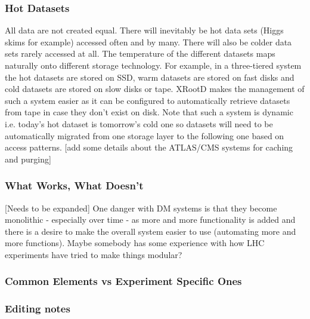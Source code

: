 \subsubsection{Hot Datasets}
All data are not created equal. There will inevitably be hot data sets (Higgs skims for example) accessed often and by 
many. There will also be colder data sets rarely accessed at all. The temperature of the different datasets maps  
naturally onto different storage technology. For example, in a three-tiered system the hot datasets are stored on SSD, 
warm datasets are stored on fast disks and cold datasets are stored on slow disks or tape. XRootD makes the 
management of such a system easier as it can be configured to automatically retrieve datasets from tape in case they 
don't exist on disk. Note that such a system is dynamic i.e. today's hot dataset is tomorrow's cold one so datasets will 
need to be automatically migrated from one storage layer to the following one based on access patterns. [add some details about the ATLAS/CMS systems for caching and purging] 



\subsubsection{What Works, What Doesn't}
[Needs to be expanded] One danger with DM systems is that they become monolithic - especially over time - as more 
and more functionality is added and there is a desire to make the overall system easier to use (automating more 
and more functions). Maybe somebody has some experience with how LHC experiments have tried to make things modular?


\subsubsection{Common Elements vs Experiment Specific Ones}



\subsubsection{Editing notes}


